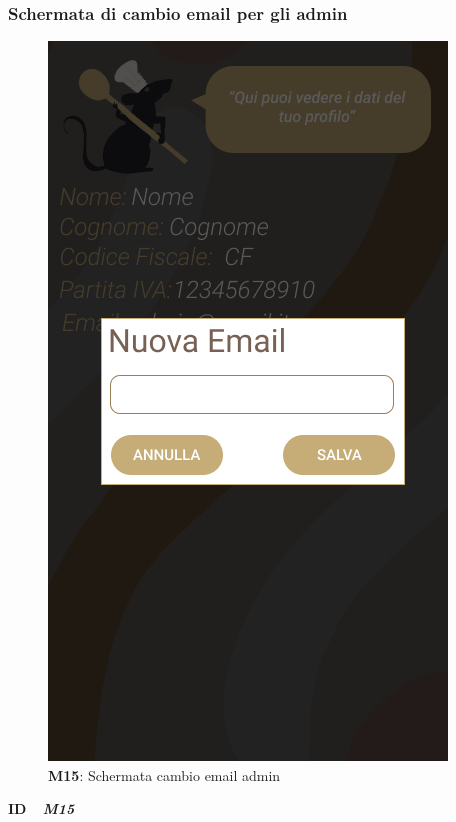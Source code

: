                 \subsubsection{Schermata di cambio email per gli admin}
                  \begin{figure}[H]
                    \centering
                    \includegraphics[scale=0.5]{assets/diagrammi/Mockup/Mockup_AdminChangeMail.png}
                    \caption*{\textbf{M15}: Schermata cambio email admin}\label{fig:Mockup_AdminChangeMail}
                  \end{figure}
        
                  \begin{flushleft}
                    \textbf{ID}   \ \Large{ \emph{\textbf{M15}}}
                  \end{flushleft}
        
